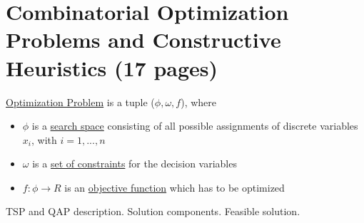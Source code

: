\section{Combinatorial Optimization Problems and Constructive
Heuristics (17 pages)}

\begin{definition}
	\underline{Optimization Problem} is a tuple ($\phi,\omega, f$), where
	\begin{itemize}
		\item{$\phi$ is a \underline{search space} consisting of all possible assignments of discrete variables $x_i$, with $i=1,...,n$ }
		\item{$\omega$ is a \underline{set of constraints} for the decision variables}
		\item{$f:\phi \to R$ is an \underline{objective function} which has to be optimized}
	\end{itemize}
\end{definition}

TSP and QAP description.
Solution components.
Feasible solution.